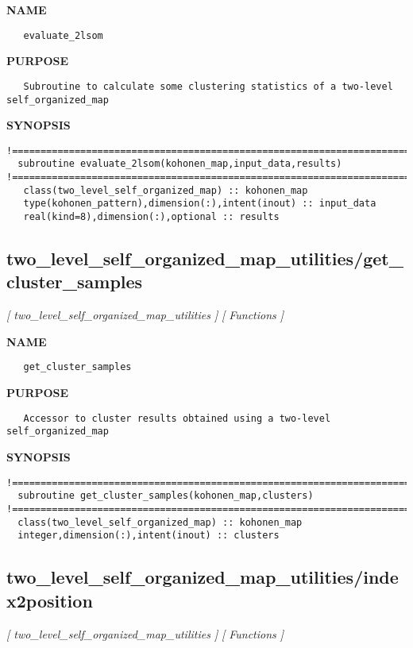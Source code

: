 \documentclass{article}
\begin{document}
\label{ch:robo69}
\label{ch:two_level_self_organized_map_utilities_evaluate_2lsom}
\textbf{NAME}
\begin{verbatim}
   evaluate_2lsom
\end{verbatim}
\textbf{PURPOSE}
\begin{verbatim}
   Subroutine to calculate some clustering statistics of a two-level self_organized_map 
\end{verbatim}
\textbf{SYNOPSIS}
\begin{verbatim}
!========================================================================================  
  subroutine evaluate_2lsom(kohonen_map,input_data,results)
!========================================================================================
   class(two_level_self_organized_map) :: kohonen_map
   type(kohonen_pattern),dimension(:),intent(inout) :: input_data
   real(kind=8),dimension(:),optional :: results
\end{verbatim}
\newpage
\subsection{two\_level\_self\_organized\_map\_utilities/get\_cluster\_samples}
\textsl{[ two\_level\_self\_organized\_map\_utilities ]}
\textsl{[ Functions ]}

\label{ch:robo70}
\label{ch:two_level_self_organized_map_utilities_get_cluster_samples}
\textbf{NAME}
\begin{verbatim}
   get_cluster_samples
\end{verbatim}
\textbf{PURPOSE}
\begin{verbatim}
   Accessor to cluster results obtained using a two-level self_organized_map 
\end{verbatim}
\textbf{SYNOPSIS}
\begin{verbatim}
!======================================================================================== 
  subroutine get_cluster_samples(kohonen_map,clusters)
!========================================================================================
  class(two_level_self_organized_map) :: kohonen_map
  integer,dimension(:),intent(inout) :: clusters
\end{verbatim}
\newpage
\subsection{two\_level\_self\_organized\_map\_utilities/index2position}
\textsl{[ two\_level\_self\_organized\_map\_utilities ]}
\textsl{[ Functions ]}
\end{document}
